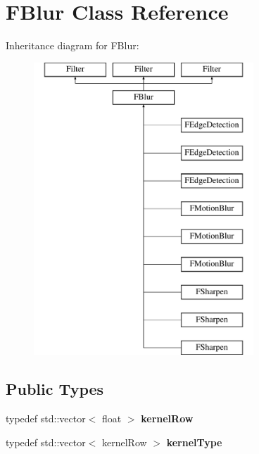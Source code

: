 \hypertarget{classFBlur}{\section{F\-Blur Class Reference}
\label{classFBlur}
}
Inheritance diagram for F\-Blur\-:\begin{figure}[H]
\begin{center}
\leavevmode
\includegraphics[height=11.000000cm]{classFBlur}
\end{center}
\end{figure}
\subsection*{Public Types}
\begin{DoxyCompactItemize}
\item 
\hypertarget{classFBlur_af980be74bad39b36b1ed2feac783962e}{typedef std\-::vector$<$ float $>$ {\bfseries kernel\-Row}}\label{classFBlur_af980be74bad39b36b1ed2feac783962e}

\item 
\hypertarget{classFBlur_af4e3c6f668215ac48cd0319f0b94d7d8}{typedef std\-::vector$<$ kernel\-Row $>$ {\bfseries kernel\-Type}}\label{classFBlur_af4e3c6f668215ac48cd0319f0b94d7d8}

\end{DoxyCompactItemize}
